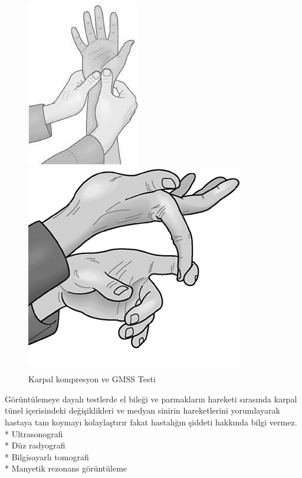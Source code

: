 \documentclass[12pt,twoside]{deuthesis}
\begin{document}
\begin{figure}

{\centering \includegraphics[width=0.49\linewidth,height=0.18\textheight]{figure/karpal_komp} \includegraphics[width=0.49\linewidth,height=0.18\textheight]{figure/gerilmis} 

}

\caption{Karpal kompresyon ve GMSS Testi }\label{fig:unnamed-chunk-4}
\end{figure}
Görüntülemeye dayalı testlerde el bileği ve parmakların hareketi sırasında karpal tünel içerisindeki değişiklikleri ve medyan sinirin hareketlerini yorumlayarak hastaya tanı koymayı kolaylaştırır fakat hastalığın şiddeti hakkında bilgi vermez.\\
* Ultrasonografi\\
* Düz radyografi\\
* Bilgisayarlı tomografi\\
* Manyetik rezonans görüntüleme\\
\end{document}
